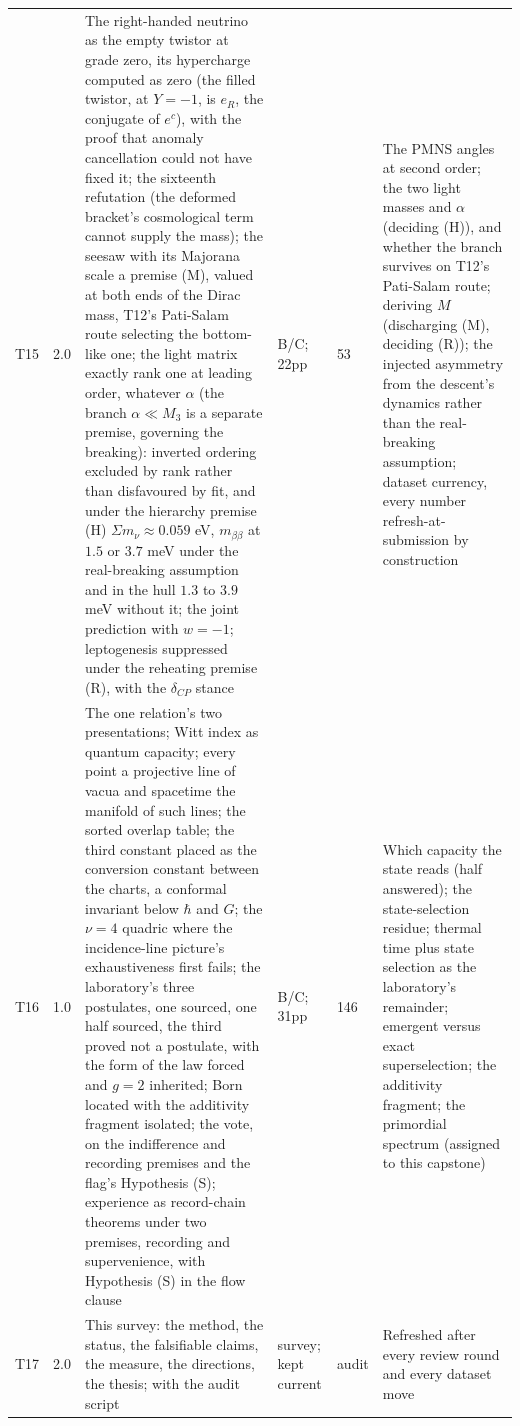 \documentclass[11pt]{article}
\theoremstyle{definition}
\theoremstyle{plain}
\providecommand{\mnu}{}\renewcommand{\mnu}{\Sigma m_{\nu}}
\begin{document}
\begin{longtable}{p{} p{} p{} p{} p{} p{}}
T15 & 2.0 & The right-handed neutrino as the empty twistor at grade zero, its hypercharge computed as zero (the filled twistor, at $Y = -1$, is $e_{R}$, the conjugate of $e^{c}$), with the proof that anomaly cancellation could not have fixed it; the sixteenth refutation (the deformed bracket's cosmological term cannot supply the mass); the seesaw with its Majorana scale a premise (M), valued at both ends of the Dirac mass, T12's Pati-Salam route selecting the bottom-like one; the light matrix exactly rank one at leading order, whatever $\alpha$ (the branch $\alpha \ll M_{3}$ is a separate premise, governing the breaking): inverted ordering excluded by rank rather than disfavoured by fit, and under the hierarchy premise (H) $\mnu \approx 0.059$ eV, $m_{\beta\beta}$ at $1.5$ or $3.7$ meV under the real-breaking assumption and in the hull $1.3$ to $3.9$ meV without it; the joint prediction with $w = -1$; leptogenesis suppressed under the reheating premise (R), with the $\delta_{CP}$ stance \cite{ButlerT15} & B/C; 22pp & 53 & The PMNS angles at second order; the two light masses and $\alpha$ (deciding (H)), and whether the branch survives on T12's Pati-Salam route; deriving $M$ (discharging (M), deciding (R)); the injected asymmetry from the descent's dynamics rather than the real-breaking assumption; dataset currency, every number refresh-at-submission by construction \\
T16 & 1.0 & The one relation's two presentations; Witt index as quantum capacity; every point a projective line of vacua and spacetime the manifold of such lines; the sorted overlap table; the third constant placed as the conversion constant between the charts, a conformal invariant below $\hbar$ and $G$; the $\nu = 4$ quadric where the incidence-line picture's exhaustiveness first fails; the laboratory's three postulates, one sourced, one half sourced, the third proved not a postulate, with the form of the law forced and $g = 2$ inherited; Born located with the additivity fragment isolated; the vote, on the indifference and recording premises and the flag's Hypothesis (S); experience as record-chain theorems under two premises, recording and supervenience, with Hypothesis (S) in the flow clause \cite{ButlerT16} & B/C; 31pp & 146 & Which capacity the state reads (half answered); the state-selection residue; thermal time plus state selection as the laboratory's remainder; emergent versus exact superselection; the additivity fragment; the primordial spectrum (assigned to this capstone) \\
T17 & 2.0 & This survey: the method, the status, the falsifiable claims, the measure, the directions, the thesis; with the audit script & survey; kept current & audit & Refreshed after every review round and every dataset move \\
\bottomrule


\end{longtable}
\end{document}
